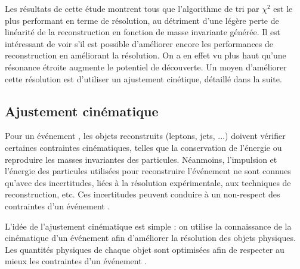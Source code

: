 \bigskip

Les résultats de cette étude montrent tous que l'algorithme de tri par $\chi^2$ est le plus performant en terme de résolution, au détriment d'une légère perte de linéarité de la reconstruction en fonction de masse invariante générée. Il est intéressant de voir s'il est possible d'améliorer encore les performances de reconstruction en améliorant la résolution. On a en effet vu plus haut qu'une résonance étroite augmente le potentiel de découverte. Un moyen d'améliorer cette résolution est d'utiliser un ajustement cinétique, détaillé dans la suite.

\subsection{Ajustement cinématique} \label{sec:mtt_kf}

Pour un événement \ttbar, les objets reconstruits (leptons, jets, ...) doivent vérifier certaines contraintes cinématiques, telles que la conservation de l'énergie ou reproduire les masses invariantes des particules. Néanmoins, l'impulsion et l'énergie des particules utilisées pour reconstruire l'événement \ttbar ne sont connues qu'avec des incertitudes, liées à la résolution expérimentale, aux techniques de reconstruction, etc. Ces incertitudes peuvent conduire à un non-respect des contraintes d'un événement \ttbar.

\medskip

L'idée de l'ajustement cinématique est simple : on utilise la connaissance de la cinématique d'un événement \ttbar afin d'améliorer la résolution des objets physiques. Les quantités physiques de chaque objet sont optimisées afin de respecter au mieux les contraintes d'un événement \ttbar.

\bigskip

